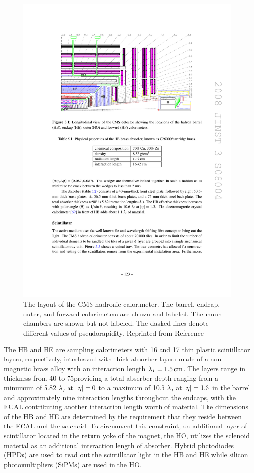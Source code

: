 \begin{figure}[htbp]
  \centering
  \includegraphics[width=\textwidth]{Detector/Figures/cms_hcal.pdf}
  \caption{
    The layout of the CMS hadronic calorimeter.
    The barrel, endcap, outer, and forward calorimeters are shown and labeled.
    The muon chambers are shown but not labeled. 
    The dashed lines denote different values of pseudorapidity.
    Reprinted from Reference~\cite{CMS2008}. 
  }
  \label{fig:cms_hcal}
\end{figure}

The HB and HE are sampling calorimeters with 16 and 17 thin plastic scintillator layers, respectively,  interleaved with thick absorber layers made of a non-magnetic brass alloy with an interaction length $\lambda_I = 1.5\,\text{cm}$.
The layers range in thickness from 40 to 75\mm providing a total absorber depth ranging from a minumum of 5.82 $\lambda_I$ at $\lvert \eta \rvert=0$ to a maximum of 10.6 $\lambda_I$ at $\lvert \eta \rvert = 1.3$ in the barrel and approximately nine interaction lengths throughout the endcaps, with the ECAL contributing another interaction length worth of material.
The dimensions of the HB and HE are determined by the requirement that they reside between the ECAL and the solenoid. 
To circumvent this constraint, an additional layer of scintillator located in the return yoke of the magnet, the HO, utilizes the solenoid material as an additional interaction length of absorber.
Hybrid photodiodes (HPDs) are used to read out the scintillator light in the HB and HE while silicon photomultipliers (SiPMs) are used in the HO.

